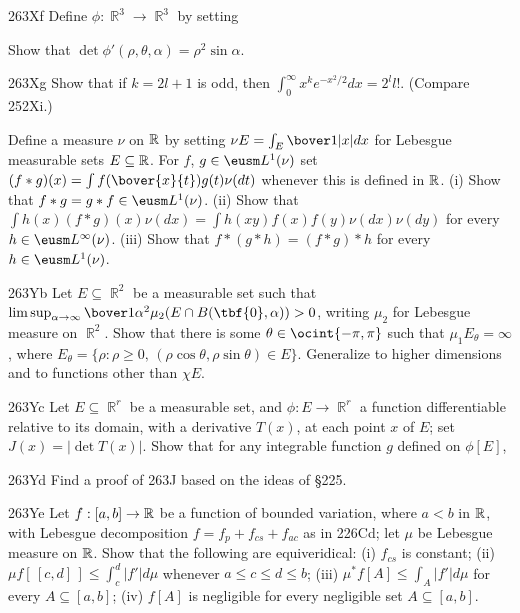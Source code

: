 {\sqheader 263Xf Define $\phi:\BbbR^3\to\BbbR^3$ by
setting


\noindent Show that $\det\phi'(\rho,\theta,\alpha)=\rho^2\sin\alpha$.

\spheader 263Xg Show that if $k=2l+1$ is odd, then
$\int_0^{\infty}x^ke^{-x^2/2}dx=2^ll!$.   (Compare 252Xi.)

Define a measure $\nu$ on $\Bbb R$ by setting
$\nu E=\int_E\bover1{|x|}dx$ for Lebesgue measurable sets
$E\subseteq\Bbb R$.   For $f$, $g\in\eusm L^1(\nu)$ set
$(f*g)(x)=\int f(\bover{x}{t})g(t)\nu(dt)$ whenever this is defined in
$\Bbb R$.   (i) Show that $f*g=g*f\in\eusm L^1(\nu)$.   (ii) Show that
$\int h(x)(f*g)(x)\nu(dx)=\int h(xy)f(x)f(y)\nu(dx)\nu(dy)$ for every
$h\in\eusm L^{\infty}(\nu)$.   (iii) Show that $f*(g*h)=(f*g)*h$ for
every $h\in\eusm L^1(\nu)$.   

\spheader 263Yb Let $E\subseteq\BbbR^2$ be a measurable set such that
$\limsup_{\alpha\to\infty}
\bover1{\alpha^2}\mu_2(E\cap B(\tbf{0},\alpha))>0$, writing $\mu_2$ for
Lebesgue measure on
$\BbbR^2$.   Show that there is some $\theta\in\ocint{-\pi,\pi}$ such
that $\mu_1E_{\theta}=\infty$, where
$E_{\theta}=\{\rho:\rho\ge 0,\,(\rho\cos\theta,\rho\sin\theta)\in E\}$.
Generalize to higher dimensions and to functions other than $\chi E$.

\spheader 263Yc Let $E\subseteq\BbbR^r$ be a measurable set,
and $\phi:E\to\BbbR^r$ a function differentiable relative to its domain,
with a derivative $T(x)$, at each point $x$ of $E$;  set
$J(x)=|\det T(x)|$.
Show that for any integrable function $g$ defined on $\phi[E]$,


\spheader 263Yd Find a proof of 263J based on the ideas of \S225.

\spheader 263Ye Let $f:[a,b]\to\Bbb R$ be a function of bounded
variation, where $a<b$ in $\Bbb R$, with Lebesgue decomposition
$f=f_p+f_{cs}+f_{ac}$ as in 226Cd;  let $\mu$ be Lebesgue measure on
$\Bbb R$.   Show that the following are equiveridical:  (i) $f_{cs}$ is
constant;  (ii) $\mu f[\,[c,d]\,]\le\int_c^d|f'|d\mu$ whenever
$a\le c\le d\le b$;   (iii)
$\mu^*f[A]\le\int_A|f'|d\mu$ for every $A\subseteq[a,b]$;   (iv) $f[A]$
is negligible for every negligible set $A\subseteq[a,b]$.   

}
